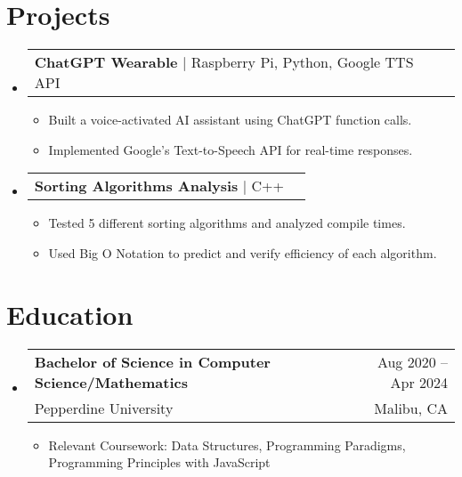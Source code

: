 \documentclass[letterpaper,11pt]{article}
\makeatletter
\newcommand{\resumeItem}[1]{
  \item\small{#1 \vspace{-2pt}}
}
\newcommand{\resumeSubheading}[4]{
  \vspace{-2pt}\item
    \begin{tabular*}{0.97\textwidth}[t]{l@{\extracolsep{\fill}}r}
      \textbf{#1} & {\small #2} \\
      {\small #3} & {\small #4} \\
    \end{tabular*}\vspace{-7pt}
}
\newcommand{\resumeProjectHeading}[2]{
    \item
    \begin{tabular*}{0.97\textwidth}{l@{\extracolsep{\fill}}r}
      \small#1 & #2 \\
    \end{tabular*}\vspace{-7pt}
}
\newcommand{\resumeItemListStart}{\begin{itemize}}
\newcommand{\resumeItemListEnd}{\end{itemize}\vspace{-5pt}}
\newcommand{\resumeSubHeadingListStart}{\begin{itemize}[leftmargin=0.15in, label={}]}
\newcommand{\resumeSubHeadingListEnd}{\end{itemize}}
\makeatother
\begin{document}
\section{Projects}
\resumeSubHeadingListStart
  \resumeProjectHeading{\textbf{ChatGPT Wearable} $|$ {Raspberry Pi, Python, Google TTS API}}{}
    \resumeItemListStart
      \resumeItem{Built a voice-activated AI assistant using ChatGPT function calls.}
      \resumeItem{Implemented Google’s Text-to-Speech API for real-time responses.}
    \resumeItemListEnd

  \resumeProjectHeading{\textbf{Sorting Algorithms Analysis} $|$ {C++}}{}
    \resumeItemListStart
      \resumeItem{Tested 5 different sorting algorithms and analyzed compile times.}
      \resumeItem{Used Big O Notation to predict and verify efficiency of each algorithm.}
    \resumeItemListEnd
\resumeSubHeadingListEnd

\section{Education}
\resumeSubHeadingListStart
  \resumeSubheading
    {Bachelor of Science in Computer Science/Mathematics}{Aug 2020 -- Apr 2024}
    {Pepperdine University}{Malibu, CA}
    \resumeItemListStart
      \resumeItem{Relevant Coursework: Data Structures, Programming Paradigms, Programming Principles with JavaScript}
    \resumeItemListEnd
\resumeSubHeadingListEnd
\end{document}
